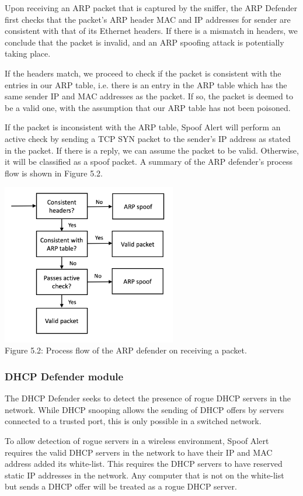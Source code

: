 \documentclass{acm_proc_article-sp}
\begin{document}
Upon receiving an ARP packet that is captured by the sniffer, the ARP Defender first checks that the packet's ARP header MAC and IP addresses for sender are consistent with that of its Ethernet headers. If there is a mismatch in headers, we conclude that the packet is invalid, and an ARP spoofing attack is potentially taking place.

If the headers match, we proceed to check if the packet is consistent with the entries in our ARP table, i.e. there is an entry in the ARP table which has the same sender IP and MAC addresses as the packet. If so, the packet is deemed to be a valid one, with the assumption that our ARP table has not been poisoned.

If the packet is inconsistent with the ARP table, Spoof Alert will perform an active check by sending a TCP SYN packet to the sender's IP address as stated in the packet. If there is a reply, we can assume the packet to be valid. Otherwise, it will be classified as a spoof packet.
A summary of the ARP defender’s process flow is shown in Figure 5.2.

\includegraphics[width=3in]{architecture02.png} \\
Figure 5.2: Process flow of the ARP defender on receiving a packet.

\subsubsection{DHCP Defender module}

The DHCP Defender seeks to detect the presence of rogue DHCP servers in the network. While DHCP snooping allows the sending of DHCP offers by servers connected to a trusted port, this is only possible in a switched network. 

To allow detection of rogue servers in a wireless environment, Spoof Alert requires the valid DHCP servers in the network to have their IP and MAC address added its white-list. This requires the DHCP servers to have reserved static IP addresses in the network. Any computer that is not on the white-list but sends a DHCP offer will be treated as a rogue DHCP server. 
\end{document}
